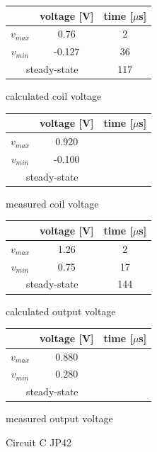 \documentclass[notitlepage, a4paper, 11pt]{article}
\begin{document}
		\begin{figure}[H]
		\begin{subtable}{0.45 \textwidth}
	\centering
	\begin{tabular}{|c|c|c|}
	\hline
	& voltage [V] & time [$\mu$s] \\
	\hline
	$v_{max}$ & 0.76 & 2 \\
	\hline
	$v_{min}$ & -0.127 & 36\\
	\hline
	\multicolumn{2}{|c|}{ steady-state} & 117 \\
	\hline
	\end{tabular}
	\caption{calculated coil voltage}
\end{subtable}
\hfill
\begin{subtable}{0.45 \textwidth}
	\centering
	\begin{tabular}{|c|c|c|}
		\hline
		& voltage [V] & time [$\mu$s] \\
		\hline
		$v_{max}$ & 0.920 &  \\
		\hline
		$v_{min}$ & -0.100 & \\
		\hline
		\multicolumn{2}{|c|}{ steady-state} & \\
		\hline
	\end{tabular}
	\caption{measured coil voltage}
\end{subtable}
\begin{subtable}{0.45 \textwidth}
	\centering
	\begin{tabular}{|c|c|c|}
	\hline
& voltage [V] & time [$\mu$s] \\
\hline
$v_{max}$ & 1.26 & 2 \\
\hline
$v_{min}$ & 0.75 & 17 \\
\hline
\multicolumn{2}{|c|}{ steady-state} & 144 \\
\hline
	\end{tabular}
	\caption{calculated output voltage}
\end{subtable}
\hfill
\begin{subtable}{0.45 \textwidth}
	\centering
	\begin{tabular}{|c|c|c|}
		\hline
		& voltage [V] & time [$\mu$s] \\
		\hline
		$v_{max}$ & 0.880 &  \\
		\hline
		$v_{min}$ & 0.280 & \\
		\hline
		\multicolumn{2}{|c|}{ steady-state} & \\
		\hline
	\end{tabular}
	\caption{measured output voltage}
\end{subtable}
		\caption{Circuit C JP42}
	\end{figure}
	
\end{document}
